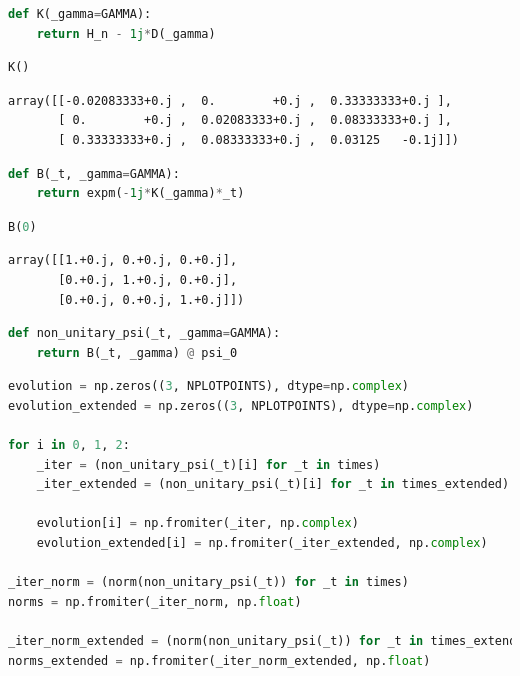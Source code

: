 \begin{lstlisting}[language=Python]
def K(_gamma=GAMMA):
    return H_n - 1j*D(_gamma)
\end{lstlisting}

\begin{lstlisting}[language=Python]
K()
\end{lstlisting}

\begin{lstlisting}
array([[-0.02083333+0.j ,  0.        +0.j ,  0.33333333+0.j ],
       [ 0.        +0.j ,  0.02083333+0.j ,  0.08333333+0.j ],
       [ 0.33333333+0.j ,  0.08333333+0.j ,  0.03125   -0.1j]])
\end{lstlisting}

\begin{lstlisting}[language=Python]
def B(_t, _gamma=GAMMA):
    return expm(-1j*K(_gamma)*_t)
\end{lstlisting}

\begin{lstlisting}[language=Python]
B(0)
\end{lstlisting}

\begin{lstlisting}
array([[1.+0.j, 0.+0.j, 0.+0.j],
       [0.+0.j, 1.+0.j, 0.+0.j],
       [0.+0.j, 0.+0.j, 1.+0.j]])
\end{lstlisting}

\begin{lstlisting}[language=Python]
def non_unitary_psi(_t, _gamma=GAMMA):
    return B(_t, _gamma) @ psi_0
\end{lstlisting}

\begin{lstlisting}[language=Python]
evolution = np.zeros((3, NPLOTPOINTS), dtype=np.complex)
evolution_extended = np.zeros((3, NPLOTPOINTS), dtype=np.complex)

for i in 0, 1, 2:
    _iter = (non_unitary_psi(_t)[i] for _t in times)
    _iter_extended = (non_unitary_psi(_t)[i] for _t in times_extended)

    evolution[i] = np.fromiter(_iter, np.complex)
    evolution_extended[i] = np.fromiter(_iter_extended, np.complex)

_iter_norm = (norm(non_unitary_psi(_t)) for _t in times)
norms = np.fromiter(_iter_norm, np.float)

_iter_norm_extended = (norm(non_unitary_psi(_t)) for _t in times_extended)
norms_extended = np.fromiter(_iter_norm_extended, np.float)
\end{lstlisting}

